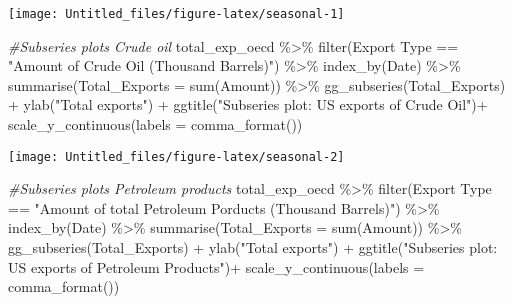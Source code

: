\documentclass[
]{article}
\newenvironment{Shaded}{\begin{snugshade}}{\end{snugshade}}
\newcommand{\AttributeTok}[1]{\textcolor[rgb]{0.77,0.63,0.00}{#1}}
\newcommand{\CommentTok}[1]{\textcolor[rgb]{0.56,0.35,0.01}{\textit{#1}}}
\newcommand{\FunctionTok}[1]{\textcolor[rgb]{0.00,0.00,0.00}{#1}}
\newcommand{\NormalTok}[1]{#1}
\newcommand{\SpecialCharTok}[1]{\textcolor[rgb]{0.00,0.00,0.00}{#1}}
\newcommand{\StringTok}[1]{\textcolor[rgb]{0.31,0.60,0.02}{#1}}
\begin{document}
\begin{center}\texttt{[image: Untitled\_files/figure-latex/seasonal-1]} \end{center}

\begin{Shaded}
\begin{Highlighting}[]
\CommentTok{\#Subseries plots Crude oil}
\NormalTok{total\_exp\_oecd }\SpecialCharTok{\%\textgreater{}\%} \FunctionTok{filter}\NormalTok{(}\StringTok{\textasciigrave{}}\AttributeTok{Export Type}\StringTok{\textasciigrave{}} \SpecialCharTok{==} \StringTok{"Amount of Crude Oil (Thousand Barrels)"}\NormalTok{) }\SpecialCharTok{\%\textgreater{}\%} 
  \FunctionTok{index\_by}\NormalTok{(Date) }\SpecialCharTok{\%\textgreater{}\%} 
  \FunctionTok{summarise}\NormalTok{(}\AttributeTok{Total\_Exports =} \FunctionTok{sum}\NormalTok{(}\StringTok{\textasciigrave{}}\AttributeTok{Amount}\StringTok{\textasciigrave{}}\NormalTok{)) }\SpecialCharTok{\%\textgreater{}\%} 
  \FunctionTok{gg\_subseries}\NormalTok{(Total\_Exports) }\SpecialCharTok{+} 
  \FunctionTok{ylab}\NormalTok{(}\StringTok{"Total exports"}\NormalTok{) }\SpecialCharTok{+} 
  \FunctionTok{ggtitle}\NormalTok{(}\StringTok{"Subseries plot: US exports of Crude Oil"}\NormalTok{)}\SpecialCharTok{+}
  \FunctionTok{scale\_y\_continuous}\NormalTok{(}\AttributeTok{labels =} \FunctionTok{comma\_format}\NormalTok{())}
\end{Highlighting}
\end{Shaded}

\begin{center}\texttt{[image: Untitled\_files/figure-latex/seasonal-2]} \end{center}

\begin{Shaded}
\begin{Highlighting}[]
\CommentTok{\#Subseries plots Petroleum products}
\NormalTok{total\_exp\_oecd }\SpecialCharTok{\%\textgreater{}\%} \FunctionTok{filter}\NormalTok{(}\StringTok{\textasciigrave{}}\AttributeTok{Export Type}\StringTok{\textasciigrave{}} \SpecialCharTok{==} \StringTok{"Amount of total Petroleum Porducts (Thousand Barrels)"}\NormalTok{) }\SpecialCharTok{\%\textgreater{}\%} 
  \FunctionTok{index\_by}\NormalTok{(Date) }\SpecialCharTok{\%\textgreater{}\%} 
  \FunctionTok{summarise}\NormalTok{(}\AttributeTok{Total\_Exports =} \FunctionTok{sum}\NormalTok{(}\StringTok{\textasciigrave{}}\AttributeTok{Amount}\StringTok{\textasciigrave{}}\NormalTok{)) }\SpecialCharTok{\%\textgreater{}\%} 
  \FunctionTok{gg\_subseries}\NormalTok{(Total\_Exports) }\SpecialCharTok{+} 
  \FunctionTok{ylab}\NormalTok{(}\StringTok{"Total exports"}\NormalTok{) }\SpecialCharTok{+} 
  \FunctionTok{ggtitle}\NormalTok{(}\StringTok{"Subseries plot: US exports of Petroleum Products"}\NormalTok{)}\SpecialCharTok{+}
  \FunctionTok{scale\_y\_continuous}\NormalTok{(}\AttributeTok{labels =} \FunctionTok{comma\_format}\NormalTok{())}
\end{Highlighting}
\end{Shaded}
\end{document}
